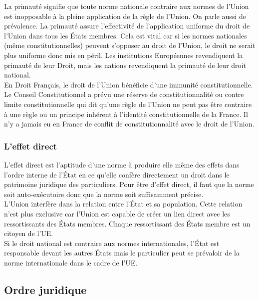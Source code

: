 \documentclass[12pt, a4paper, openany]{book}
\begin{document}
La primauté signifie que toute norme nationale contraire aux normes de l'Union est inopposable à la pleine application de la règle de l'Union. On parle aussi de prévalence. La primauté assure l'effectivité de l'application uniforme du droit de l'Union dans tous les États membres. Cela est vital car si les normes nationales (même constitutionnelles) peuvent s'opposer au droit de l'Union, le droit ne serait plus uniforme donc mis en péril. Les institutions Européennes revendiquent la primauté de leur Droit, mais les nations revendiquent la primauté de leur droit national. \\
En Droit Français, le droit de l'Union bénéficie d'une immunité constitutionnelle. Le Conseil Constitutionnel a prévu une réserve de constitutionnalité ou contre limite constitutionnelle qui dit qu'une règle de l'Union ne peut pas être contraire à une règle ou un principe inhérent à l'identité constitutionnelle de la France. Il n'y a jamais eu en France de conflit de constitutionnalité avec le droit de l'Union. 

\subsubsection{L'effet direct}

L'effet direct est l'aptitude d'une norme à produire elle même des effets dans l'ordre interne de l'État en ce qu'elle confère directement un droit dans le patrimoine juridique des particuliers. Pour être d'effet direct, il faut que la norme soit auto-exécutoire donc que la norme soit suffisamment précise. \\
L'Union interfère dans la relation entre l'État et sa population. Cette relation n'est plus exclusive car l'Union est capable de créer un lien direct avec les ressortissants des États membres. Chaque ressortissant des États membre est un citoyen de l'UE. \\
Si le droit national est contraire aux normes internationales, l'État est responsable devant les autres États mais le particulier peut se prévaloir de la norme internationale dans le cadre de l'UE. \\

\subsection{Ordre juridique}
\end{document}
